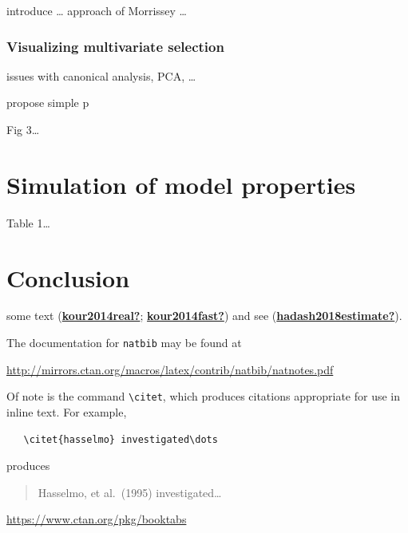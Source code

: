 \documentclass{article}
\begin{document}
introduce \ldots{} approach of Morrissey \ldots{}

\hypertarget{visualizing-multivariate-selection}{%
\subsubsection{Visualizing multivariate
selection}\label{visualizing-multivariate-selection}}

issues with canonical analysis, PCA, \ldots{}

propose simple p

Fig 3\ldots{}

\hypertarget{simulation-of-model-properties}{%
\section{Simulation of model
properties}\label{simulation-of-model-properties}}

Table 1\ldots{}

\hypertarget{conclusion}{%
\section{Conclusion}\label{conclusion}}

\label{sec:others}

\lipsum[8] some text
(\protect\hyperlink{ref-kour2014real}{\textbf{kour2014real?}};
\protect\hyperlink{ref-kour2014fast}{\textbf{kour2014fast?}}) and see
(\protect\hyperlink{ref-hadash2018estimate}{\textbf{hadash2018estimate?}}).

The documentation for \verb+natbib+ may be found at

\begin{center}
  \url{http://mirrors.ctan.org/macros/latex/contrib/natbib/natnotes.pdf}
\end{center}

Of note is the command \verb+\citet+, which produces citations
appropriate for use in inline text. For example,

\begin{verbatim}
   \citet{hasselmo} investigated\dots
\end{verbatim}

produces

\begin{quote}
  Hasselmo, et al.\ (1995) investigated\dots
\end{quote}

\begin{center}
  \url{https://www.ctan.org/pkg/booktabs}
\end{center}
\end{document}
